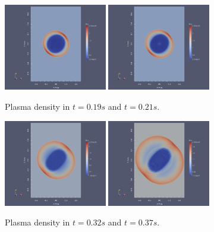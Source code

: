 \begin{figure}[H]
    \begin{center}
        \includegraphics[width=0.4\textwidth]{img/16-density.png}
        \includegraphics[width=0.4\textwidth]{img/18-density.png}
    \end{center} 
    \caption{Plasma density in $t = 0.19s$ and $t = 0.21s$.}
\end{figure} 
\begin{figure}[H]
    \begin{center}
        \includegraphics[width=0.4\textwidth]{img/20-density.png}
        \includegraphics[width=0.4\textwidth]{img/21-density.png}
    \end{center} 
    \caption{Plasma density in $t = 0.32s$ and $t = 0.37s$.}
\end{figure} 

